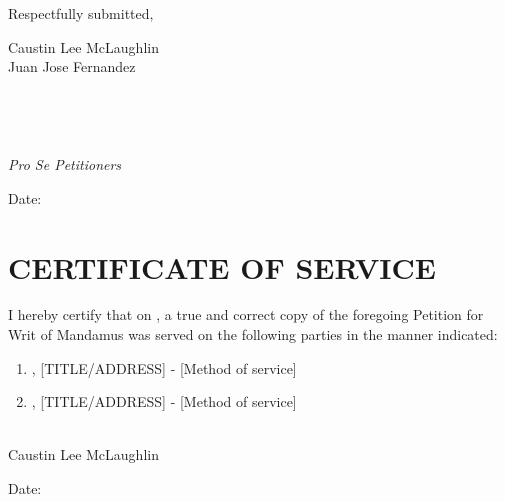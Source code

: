 \documentclass[12pt]{article}
\begin{document}
\begin{flushleft}
Respectfully submitted,
\vspace{0.5in}

Caustin Lee McLaughlin \\
Juan Jose Fernandez \\
[YOUR ADDRESS] \\
[CITY, STATE ZIP] \\
[TELEPHONE NUMBER] \\
[EMAIL ADDRESS] \\
\textit{Pro Se Petitioners}
\vspace{0.5in}

Date: \underline{\hspace{2in}}
\end{flushleft}

\newpage

\section*{CERTIFICATE OF SERVICE}

I hereby certify that on \underline{\hspace{1in}}, a true and correct copy of the foregoing Petition for Writ of Mandamus was served on the following parties in the manner indicated:

\begin{enumerate}[label=\arabic*.]
    \item [NAME], [TITLE/ADDRESS] - [Method of service]
    \item [NAME], [TITLE/ADDRESS] - [Method of service]
\end{enumerate}

\vspace{0.5in}

\underline{\hspace{3in}} \\
Caustin Lee McLaughlin

\vspace{0.25in}

Date: \underline{\hspace{2in}}

\newpage

\tableofcontents
\newpage

\end{document}
